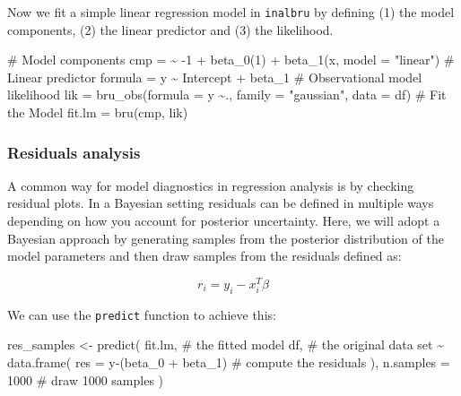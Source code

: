 \documentclass[
  letterpaper,
  DIV=11,
  numbers=noendperiod]{scrartcl}
\newenvironment{Shaded}{\begin{snugshade}}{\end{snugshade}}
\newcommand{\AttributeTok}[1]{\textcolor[rgb]{0.40,0.45,0.13}{#1}}
\newcommand{\CommentTok}[1]{\textcolor[rgb]{0.37,0.37,0.37}{#1}}
\newcommand{\DecValTok}[1]{\textcolor[rgb]{0.68,0.00,0.00}{#1}}
\newcommand{\ErrorTok}[1]{\textcolor[rgb]{0.68,0.00,0.00}{#1}}
\newcommand{\FunctionTok}[1]{\textcolor[rgb]{0.28,0.35,0.67}{#1}}
\newcommand{\NormalTok}[1]{\textcolor[rgb]{0.00,0.23,0.31}{#1}}
\newcommand{\OtherTok}[1]{\textcolor[rgb]{0.00,0.23,0.31}{#1}}
\newcommand{\SpecialCharTok}[1]{\textcolor[rgb]{0.37,0.37,0.37}{#1}}
\newcommand{\StringTok}[1]{\textcolor[rgb]{0.13,0.47,0.30}{#1}}
\begin{document}
Now we fit a simple linear regression model in \texttt{inalbru} by
defining (1) the model components, (2) the linear predictor and (3) the
likelihood.

\begin{Shaded}
\begin{Highlighting}[]
\CommentTok{\# Model components}
\NormalTok{cmp }\OtherTok{=}  \ErrorTok{\textasciitilde{}} \SpecialCharTok{{-}}\DecValTok{1} \SpecialCharTok{+} \FunctionTok{beta\_0}\NormalTok{(}\DecValTok{1}\NormalTok{) }\SpecialCharTok{+} \FunctionTok{beta\_1}\NormalTok{(x, }\AttributeTok{model =} \StringTok{"linear"}\NormalTok{)}
\CommentTok{\# Linear predictor}
\NormalTok{formula }\OtherTok{=}\NormalTok{ y }\SpecialCharTok{\textasciitilde{}}\NormalTok{ Intercept }\SpecialCharTok{+}\NormalTok{ beta\_1}
\CommentTok{\# Observational model likelihood}
\NormalTok{lik }\OtherTok{=}  \FunctionTok{bru\_obs}\NormalTok{(}\AttributeTok{formula =}\NormalTok{ y }\SpecialCharTok{\textasciitilde{}}\NormalTok{.,}
            \AttributeTok{family =} \StringTok{"gaussian"}\NormalTok{,}
            \AttributeTok{data =}\NormalTok{ df)}
\CommentTok{\# Fit the Model}
\NormalTok{fit.lm }\OtherTok{=} \FunctionTok{bru}\NormalTok{(cmp, lik)}
\end{Highlighting}
\end{Shaded}

\subsubsection{Residuals analysis}\label{residuals-analysis}

A common way for model diagnostics in regression analysis is by checking
residual plots. In a Bayesian setting residuals can be defined in
multiple ways depending on how you account for posterior uncertainty.
Here, we will adopt a Bayesian approach by generating samples from the
posterior distribution of the model parameters and then draw samples
from the residuals defined as:

\[
r_i = y_i - x_i^T\beta
\]

We can use the \texttt{predict} function to achieve this:

\begin{Shaded}
\begin{Highlighting}[]
\NormalTok{res\_samples }\OtherTok{\textless{}{-}} \FunctionTok{predict}\NormalTok{(}
\NormalTok{  fit.lm,         }\CommentTok{\# the fitted model}
\NormalTok{  df,             }\CommentTok{\# the original data set}
  \SpecialCharTok{\textasciitilde{}} \FunctionTok{data.frame}\NormalTok{(   }
    \AttributeTok{res =}\NormalTok{ y}\SpecialCharTok{{-}}\NormalTok{(beta\_0 }\SpecialCharTok{+}\NormalTok{ beta\_1)  }\CommentTok{\# compute the residuals}
\NormalTok{  ),}
  \AttributeTok{n.samples =} \DecValTok{1000}   \CommentTok{\# draw 1000 samples}
\NormalTok{)}
\end{Highlighting}
\end{Shaded}
\end{document}
